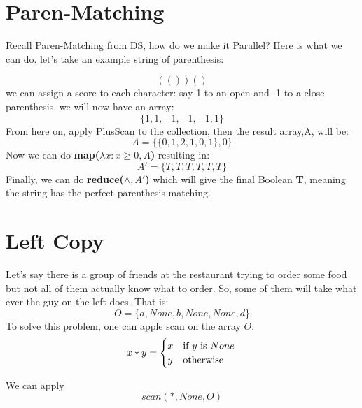 \documentclass[12pt]{article}
\begin{document}
	\MakeScribeTop
\section{Paren-Matching}
Recall Paren-Matching from DS, how do we make it Parallel? Here is what we can do. let's take an example string of parenthesis:

$$(())()$$
we can assign a score to each character: say 1 to an open and -1 to a close parenthesis. we will now have an array:
$$\{1,1,-1,-1,-1,1\}$$
From here on, apply PlusScan to the collection, then the result array,A, will be:
$$A = \{\{0,1,2,1,0,1\},0\}$$   
Now we can do \textbf{map($\lambda x: x \geq 0,A$)} resulting in:
$$A' = \{T,T,T,T,T,T\}$$
Finally, we can do \textbf{reduce($\wedge, A'$)} which will give the final Boolean \textbf{T}, meaning the string has the perfect parenthesis matching.
\section{Left Copy}
Let's say there is a group of friends at the restaurant trying to order some food but not all of them actually know what to order. So, some of them will take what ever the guy on the left does. That is:
    $$O = \{a,None, b, None, None, d\}$$
To solve this problem, one can apple scan on the array $O$.  \\
$$
x*y = \begin{cases}
x &\text{if $y$ is $None$} \\
y &\text{otherwise}
\end{cases}\\
$$

We can apply $$scan(*,None,O)$$
\end{document}
